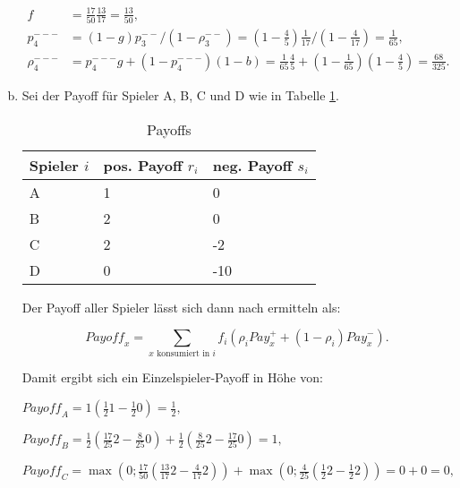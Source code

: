 \documentclass[fleqn]{article}
\begin{document}
\begin{enumerate}[a)]
$$
\begin{aligned}
    f&=\frac{17}{50} \frac{13}{17} = \frac{13}{50} ,\\
    p_{4}^{---}&=(1-g) p_3^{--} / (1- \rho_3^{--}) = \left(1-\frac{4}{5}\right) \frac{1}{17} / \left(1 -\frac{4}{17}\right) = \frac{1}{65}, \\
    \rho_{4}^{---}&= p_{4}^{---} g+\left(1-p_{4}^{---}\right)(1-b) = \frac{1}{65} \frac{4}{5}+\left(1- \frac{1}{65}\right) \left(1- \frac{4}{5}\right)=\frac{68}{325}.
\end{aligned}
$$

	\item\label{it:payoffs} Sei der Payoff für Spieler A, B, C und D wie in Tabelle \ref{tab:payoffs}.
  
  \begin{table}[H]
    \centering
        \begin{tabular}{l l l}
	      	\hline Spieler $i$  & pos. Payoff $r_{i}$ & neg. Payoff $s_{i}$ \\
	      	\hline A & 1                   & 0                   \\
	      	\hline B & 2                   & 0                   \\
	      	\hline C & 2                   & -2                  \\
	      	\hline D & 0                   & -10                 \\
	      	\hline
        \end{tabular}
        \caption{Payoffs}
        \label{tab:payoffs}
  \end{table}      

  Der Payoff aller Spieler lässt sich dann nach \textcite[S.~17]{nazemi_2020} ermitteln als:

  $${Payoff}_{x}=\sum_{x \text { konsumiert in } i} f_{i} \left(\rho_{i} {Pay}_{x}^{+}+\left(1-\rho_{i}\right) {Pay}_{x}^{-}\right).$$

  Damit ergibt sich ein Einzelspieler-Payoff in Höhe von:

  ${Payoff}_{A}=1 \left(\frac{1}{2} 1 - \frac{1}{2} 0\right)= \frac{1}{2},$

  ${Payoff}_{B}=\frac{1}{2} \left(\frac{17}{25} 2-\frac{8}{25} 0\right)+\frac{1}{2} \left(\frac{8}{25} 2-\frac{17}{25} 0\right)=1,$

  ${Payoff}_{C}=\max \left(0 ; \frac{17}{50} \left(\frac{13}{17}  2-\frac{4}{17}  2\right)\right)+\max \left(0 ; \frac{4}{25} \left(\frac{1}{2}  2-\frac{1}{2}  2\right)\right) = 0+0=0,$
  

\end{enumerate}
\end{document}
